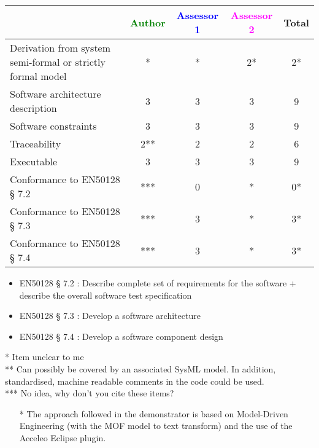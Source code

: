 \begin{tabular}{|l | c | c | c | c|}
\hline
& \textcolor{green}{Author} & \textcolor{blue}{Assessor 1} & \textcolor{magenta}{Assessor 2} & Total \\
\hline
Derivation from system semi-formal or strictly formal model &* & * &2* & 2* \\
\hline
Software architecture description &3 & 3 &3 & 9 \\
\hline
Software constraints &3 &3 &3 & 9 \\
\hline
Traceability &2** &2 &2 & 6 \\
\hline
Executable &3 &3 &3 & 9 \\
\hline
Conformance to EN50128 § 7.2 &*** &0 & *  & 0* \\
\hline
Conformance to EN50128 § 7.3 &*** &3 &  * & 3* \\
\hline
Conformance to EN50128 § 7.4 &*** &3 & * & 3* \\
\hline
\end{tabular}
\begin{assessor1}
\begin{itemize}
\item  EN50128 § 7.2 : Describe complete set of requirements for the
  software + describe the overall software test specification
\item EN50128 § 7.3 :  Develop a software architecture 
\item EN50128 § 7.4 : Develop a software component design
\end{itemize}
\end{assessor1}

\begin{author_comment}
* Item unclear to me\\
** Can possibly be covered by an associated SysML model. In addition, standardised, machine readable comments in the code could be used.\\
*** No idea, why don't you cite these items?
\end{author_comment}

\begin{assessor2}
  \begin{itemize}
  \item[*] The approach followed in the demonstrator is based on
    Model-Driven Engineering (with the MOF model to text transform)
    and the use of the Acceleo Eclipse plugin.
  \end{itemize}  
\end{assessor2}



